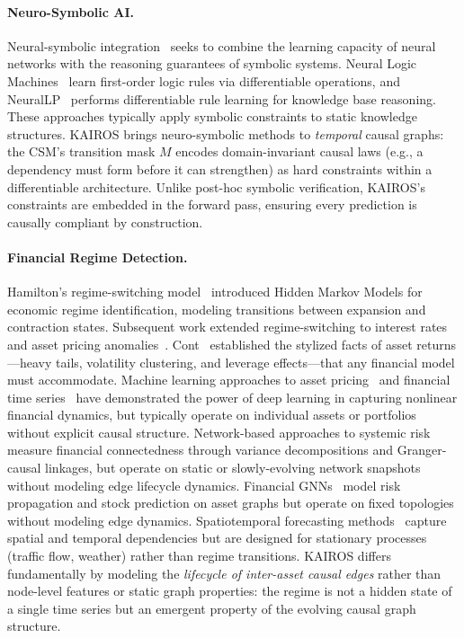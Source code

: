 \documentclass[11pt]{article}
\begin{document}
\paragraph{Neuro-Symbolic AI.}
Neural-symbolic integration~\citep{garcez2019neural_symbolic,lamb2020gnn_neurosymbolic} seeks to combine the learning capacity of neural networks with the reasoning guarantees of symbolic systems. Neural Logic Machines~\citep{dong2019nlm} learn first-order logic rules via differentiable operations, and NeuralLP~\citep{yang2017neurallp} performs differentiable rule learning for knowledge base reasoning. These approaches typically apply symbolic constraints to static knowledge structures. KAIROS brings neuro-symbolic methods to \emph{temporal} causal graphs: the CSM's transition mask $M$ encodes domain-invariant causal laws (e.g., a dependency must form before it can strengthen) as hard constraints within a differentiable architecture. Unlike post-hoc symbolic verification, KAIROS's constraints are embedded in the forward pass, ensuring every prediction is causally compliant by construction.

\paragraph{Financial Regime Detection.}
Hamilton's regime-switching model~\citep{hamilton1989hmm} introduced Hidden Markov Models for economic regime identification, modeling transitions between expansion and contraction states. Subsequent work extended regime-switching to interest rates~\citep{ang2002regime} and asset pricing anomalies~\citep{guidolin2008size}. Cont~\citep{cont2001stylized} established the stylized facts of asset returns---heavy tails, volatility clustering, and leverage effects---that any financial model must accommodate. Machine learning approaches to asset pricing~\citep{gu2020empirical} and financial time series~\citep{bao2017deep,lopezdeprado2018advances} have demonstrated the power of deep learning in capturing nonlinear financial dynamics, but typically operate on individual assets or portfolios without explicit causal structure. Network-based approaches to systemic risk~\citep{diebold2014connectedness,billio2012systemic,acemoglu2015systemic} measure financial connectedness through variance decompositions and Granger-causal linkages, but operate on static or slowly-evolving network snapshots without modeling edge lifecycle dynamics. Financial GNNs~\citep{chen2022financial_gnn,feng2019temporal,sawhney2021stock,cheng2021financial} model risk propagation and stock prediction on asset graphs but operate on fixed topologies without modeling edge dynamics. Spatiotemporal forecasting methods~\citep{li2018dcrnn,yu2018stgcn} capture spatial and temporal dependencies but are designed for stationary processes (traffic flow, weather) rather than regime transitions. KAIROS differs fundamentally by modeling the \emph{lifecycle of inter-asset causal edges} rather than node-level features or static graph properties: the regime is not a hidden state of a single time series but an emergent property of the evolving causal graph structure.
\end{document}
